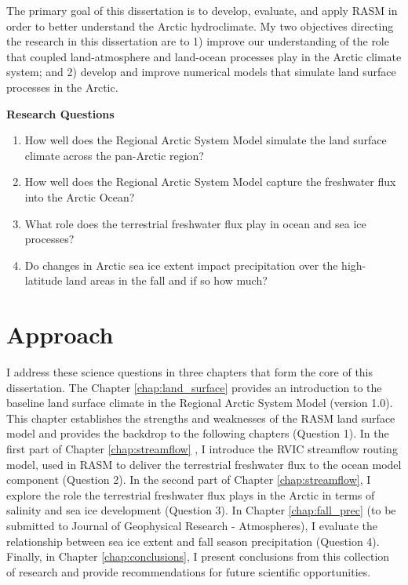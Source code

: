 The primary goal of this dissertation is to develop, evaluate, and apply RASM in order to better understand the Arctic hydroclimate.
My two objectives directing the research in this dissertation are to 1) improve our understanding of the role that coupled land-atmosphere and land-ocean processes play in the Arctic climate system; and 2) develop and improve numerical models that simulate land surface processes in the Arctic.

\clearpage
\begin{mdframed}
  {\bf Research Questions}
  \begin{enumerate}
    \item How well does the Regional Arctic System Model simulate the land surface climate across the pan-Arctic region?
    \item How well does the Regional Arctic System Model capture the freshwater flux into the Arctic Ocean?
    \item What role does the terrestrial freshwater flux play in ocean and sea ice processes?
    \item Do changes in Arctic sea ice extent impact precipitation over the high-latitude land areas in the fall and if so how much?
  \end{enumerate}
\end{mdframed}

\section{Approach}

I address these science questions in three chapters that form the core of this dissertation.
The Chapter \ref{chap:land_surface} \citep[published as ][]{Hamman_2016a} provides an introduction to the baseline land surface climate in the Regional Arctic System Model (version 1.0).
This chapter establishes the strengths and weaknesses of the RASM land surface model and provides the backdrop to the following chapters (Question 1).
In the first part of Chapter \ref{chap:streamflow} \citep{Hamman_2016b}, I introduce the RVIC streamflow routing model, used in RASM to deliver the terrestrial freshwater flux to the ocean model component (Question 2).
In the second part of Chapter \ref{chap:streamflow}, I explore the role the terrestrial freshwater flux plays in the Arctic in terms of salinity and sea ice development (Question 3).
In Chapter \ref{chap:fall_prec} (to be submitted to Journal of Geophysical Research - Atmospheres), I evaluate the relationship between sea ice extent and fall season precipitation (Question 4).
Finally, in Chapter \ref{chap:conclusions}, I present conclusions from this collection of research and provide recommendations for future scientific opportunities.
